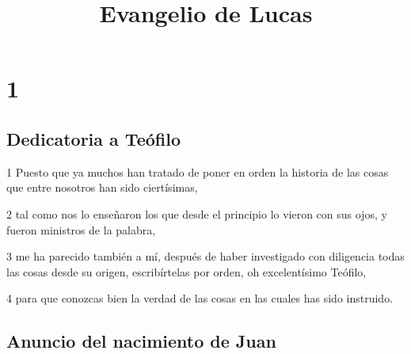
\title{Evangelio de Lucas}

\chapter{1}

\section*{Dedicatoria a Teófilo}

\par 1 Puesto que ya muchos han tratado de poner en orden la historia de las cosas que entre nosotros han sido ciertísimas,
\par 2 tal como nos lo enseñaron los que desde el principio lo vieron con sus ojos, y fueron ministros de la palabra,
\par 3 me ha parecido también a mí, después de haber investigado con diligencia todas las cosas desde su origen, escribírtelas por orden, oh excelentísimo Teófilo,
\par 4 para que conozcas bien la verdad de las cosas en las cuales has sido instruido.

\section*{Anuncio del nacimiento de Juan}

